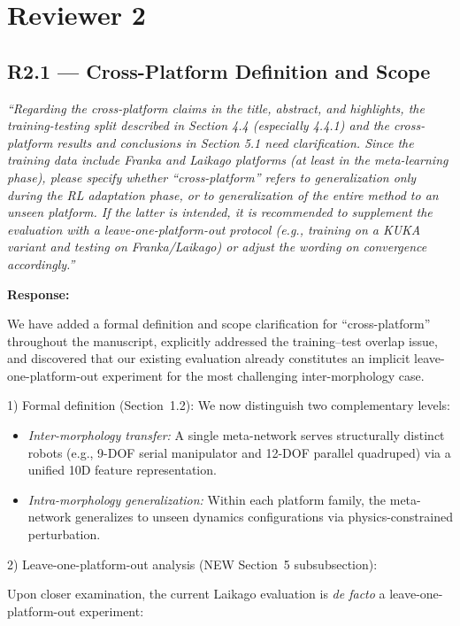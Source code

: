 \documentclass[11pt,a4paper]{article}
\newcommand{\reviewercomment}[1]{\medskip\noindent\textit{``#1''}\medskip}
\newcommand{\response}{\noindent\textbf{Response:}\par\noindent}
\begin{document}
\section*{Reviewer 2}

\subsection*{R2.1 --- Cross-Platform Definition and Scope}

\reviewercomment{Regarding the cross-platform claims in the title, abstract, and highlights, the training-testing split described in Section 4.4 (especially 4.4.1) and the cross-platform results and conclusions in Section 5.1 need clarification. Since the training data include Franka and Laikago platforms (at least in the meta-learning phase), please specify whether ``cross-platform'' refers to generalization only during the RL adaptation phase, or to generalization of the entire method to an unseen platform. If the latter is intended, it is recommended to supplement the evaluation with a leave-one-platform-out protocol (e.g., training on a KUKA variant and testing on Franka/Laikago) or adjust the wording on convergence accordingly.}

\response
We have added a formal definition and scope clarification for ``cross-platform'' throughout the manuscript, explicitly addressed the training--test overlap issue, and discovered that our existing evaluation already constitutes an implicit leave-one-platform-out experiment for the most challenging inter-morphology case.

1) Formal definition (Section~1.2): We now distinguish two complementary levels:
\begin{itemize}[leftmargin=*]
\item \emph{Inter-morphology transfer:} A single meta-network serves structurally distinct robots (e.g., 9-DOF serial manipulator and 12-DOF parallel quadruped) via a unified 10D feature representation.
\item \emph{Intra-morphology generalization:} Within each platform family, the meta-network generalizes to unseen dynamics configurations via physics-constrained perturbation.
\end{itemize}

2) Leave-one-platform-out analysis (NEW Section~5 subsubsection):

Upon closer examination, the current Laikago evaluation is \emph{de facto} a leave-one-platform-out experiment:
\end{document}
